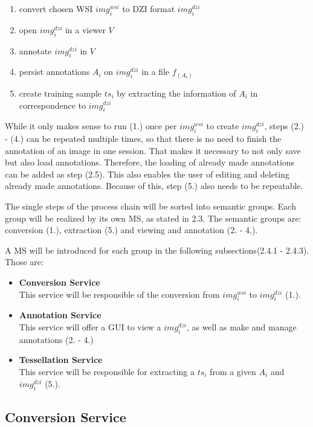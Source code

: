 \begin{enumerate}[(1.)]
	\item convert chosen WSI $img^{wsi}_i$ to DZI format $img^{dzi}_i$
	\item open $img^{dzi}_i$ in a viewer $V$
	\item annotate $img^{dzi}_i$ in $V$
	\item persist annotations $A_i$ on $img^{dzi}_i$ in a file $f_{(A_i)}$
	\item create training sample $ts_i$ by extracting the information of $A_i$ in correspondence to $img^{dzi}_i$
\end{enumerate}

While it only makes sense to run (1.) once per $img^{wsi}_i$ to create $img^{dzi}_i$, steps (2.) - (4.) can be repeated multiple times, so that there is no need to finish the annotation of an image in one session. That makes it necessary to not only save but also load annotations. Therefore, the loading of already made annotations can be added as step (2.5). This also enables the user of editing and deleting already made annotations. Because of this, step (5.) also needs to be repeatable.

The single steps of the process chain will be sorted into semantic groups. Each group will be realized by its own MS, as stated in 2.3. The semantic groups are: conversion (1.), extraction (5.) and viewing and annotation (2. - 4.).

A MS will be introduced for each group in the following subsections(2.4.1 - 2.4.3). Those are:

\begin{itemize}
	\item \textbf{Conversion Service}\\
	This service will be responsible of the conversion from $img^{wsi}_i$ to $img^{dzi}_i$ (1.).
	\item \textbf{Annotation Service}\\
	This service will offer a GUI to view a $img^{dzi}_i$, as well as make and manage annotations (2. - 4.)
	\item \textbf{Tessellation Service}\\
	This service will be responsible for extracting a $ts_i$ from a given $A_i$ and $img^{dzi}_i$ (5.).
\end{itemize}


\subsection{Conversion Service}

